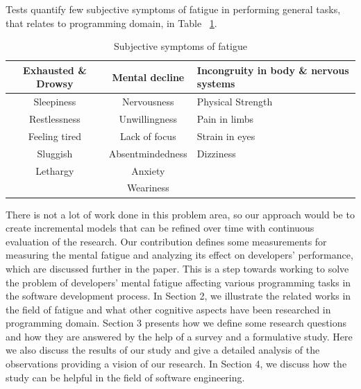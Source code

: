 \documentclass{acm_proc_article-sp}
\begin{document}
Tests \cite{saito:industry} quantify few subjective symptoms of fatigue in
performing general tasks, that relates to programming domain, in Table
~\ref{table:symptoms}.

	\begin{table}
		\centering
		\caption{Subjective symptoms of fatigue}
		\begin{tabular}{|c|c|l|} \hline
			\textbf{Exhausted \& Drowsy} & \textbf{Mental decline} & \textbf{Incongruity
			in body \& nervous systems}\\ \hline
			Sleepiness&Nervousness&Physical Strength\\ \hline
			Restlessness&Unwillingness&Pain in limbs\\ \hline
			Feeling tired&Lack of focus&Strain in eyes\\ \hline
			Sluggish&Absentmindedness&Dizziness\\ \hline
			Lethargy&Anxiety& \\ \hline
			 &Weariness& \\ \hline		
			\end{tabular}
		\label{table:symptoms}
	\end{table}

There is not a lot of work done in this problem area, so our approach would be
to create incremental models that can be refined over time with continuous
evaluation of the research. Our contribution defines some measurements
for measuring the mental fatigue and analyzing its effect on developers'
performance, which are discussed further in the paper. This is a step towards
working to solve the problem of developers' mental fatigue affecting various
programming tasks in the software development process. In Section 2, we
illustrate the related works in the field of fatigue and what other cognitive
aspects have been researched in programming domain. Section 3 presents how
we define some research questions and how they are answered by the help
of a survey and a formulative study. Here we also discuss the results of our
study and give a detailed analysis of the observations providing a vision of our
research. In Section 4, we discuss how the study can be helpful in the field
of software engineering.
\end{document}
